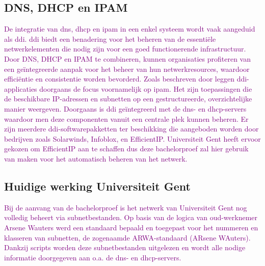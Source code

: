 \subsection{DNS, DHCP en IPAM}
\textcolor{purple}{De integratie van \acrshort{dns}, \acrshort{dhcp} en \acrshort{ipam} in een enkel systeem wordt vaak aangeduid als \acrfull{ddi}. \acrshort{ddi} biedt een benadering voor het beheren van de essentiële netwerkelementen die nodig zijn voor een goed functionerende infrastructuur. Door DNS, DHCP en IPAM te combineren, kunnen organisaties profiteren van een geïntegreerde aanpak voor het beheer van hun netwerkresources, waardoor efficiëntie en consistentie worden bevorderd.
    Zoals beschreven door \textcite{Fontein2023} leggen \acrshort{ddi}-applicaties doorgaans de focus voornamelijk op \acrshort{ipam}. Het zijn toepassingen die de beschikbare \acrshort{IP}-adressen en subnetten op een gestructureerde, overzichtelijke manier weergeven. Doorgaans is \acrshort{ddi} geïntegreerd met de \acrshort{dns}- en \acrshort{dhcp}-servers waardoor men deze componenten vanuit een centrale plek kunnen beheren. Er zijn meerdere \acrshort{ddi}-softwarepakketten ter beschikking die aangeboden worden door bedrijven zoals Solarwinds, Infoblox, en EfficientIP. Universiteit Gent heeft ervoor gekozen om EfficientIP aan te schaffen dus deze bachelorproef zal hier gebruik van maken voor het automatisch beheren van het netwerk.}

\subsection{Huidige werking Universiteit Gent}
\textcolor{purple}{Bij de aanvang van de bachelorproef is het netwerk van Universiteit Gent nog volledig beheert via subnetbestanden. Op basis van de logica van oud-werknemer Arsene Wauters werd een standaard bepaald en toegepast voor het nummeren en klasseren van subnetten, de zogenaamde ARWA-standaard (ARsene WAuters). Dankzij scripts worden deze subnetbestanden uitgelezen en wordt alle nodige informatie doorgegeven aan o.a. de \acrshort{dns}- en \acrshort{dhcp}-servers.}

